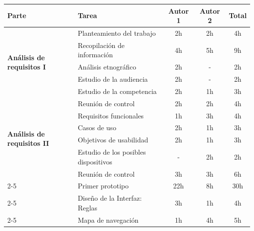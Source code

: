 \documentclass[11pt]{article}
\begin{document}
\begin{table}[h!]
    \center
    \small
    \begin{tabular}{|p{5cm}|p{5cm}|c|c|c|}
        \bottomrule
        \rowcolor{emerald}
        \textbf{Parte} & \textbf{Tarea} & \textbf{Autor 1} & \textbf{Autor 2} & \textbf{Total}\\
        \toprule
        \bottomrule
        \multirow{5}{*}{\textbf{Análisis de requisitos I}} & Planteamiento del trabajo & 2h & 2h & 4h \\
        \cline{2-5}
                                                           & Recopilación de información & 4h & 5h & 9h \\
        \cline{2-5}
                                                           & Análisis etnográfico & 2h & - & 2h \\
        \cline{2-5}
                                                           & Estudio de la audiencia & 2h & - & 2h \\
        \cline{2-5}                       
                                                           & Estudio de la competencia & 2h & 1h & 3h \\
        \hline
        \multirow{6}{*}{\textbf{Análisis de requisitos II}} & Reunión de control & 2h & 2h & 4h \\
        \cline{2-5}
                                                            & Requisitos funcionales & 1h & 3h & 4h \\
        \cline{2-5}
                                                            & Casos de uso & 2h & 1h & 3h \\
        \cline{2-5}
                                                            & Objetivos de usabilidad & 2h & 1h & 3h \\
        \cline{2-5}                       
                                                            & Estudio de los posibles dispositivos & - & 2h & 2h \\
        \hline
        \multirow{4}{*}{\textbf{Documento de diseño I}} & Reunión de control & 3h & 3h & 6h \\
        \cline{2-5}
                                                        & Primer prototipo & 22h & 8h & 30h \\
        \cline{2-5}
                                                        & Diseño de la Interfaz: Reglas & 3h & 1h & 4h \\
        \cline{2-5}
                                                        & Mapa de navegación & 1h & 4h & 5h \\

\end{tabular}
\end{table}
\end{document}
